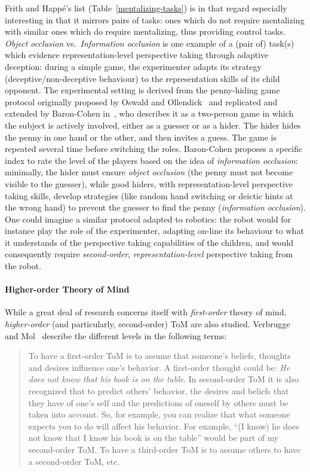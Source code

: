 \documentclass{sig-alternate}
\begin{document}
Frith and Happé's list (Table~\ref{mentalizing-tasks}) is in that regard
especially interesting in that it mirrors pairs of tasks: ones which do not
require mentalizing with similar ones which do require mentalizing, thus
providing control tasks.  \emph{Object occlusion} vs.~\emph{Information
occlusion} is one example of a (pair of) task(s) which evidence
representation-level perspective taking through adaptive deception: during a
simple game, the experimenter adapts its strategy (deceptive/non-deceptive
behaviour) to the representation skills of its child opponent. The experimental
setting is derived from the penny-hiding game protocol originally proposed by
Oswald and Ollendick~\cite{oswald1989role} and replicated and extended by
Baron-Cohen in~\cite{baron1992out}, who describes it as a two-person game in
which the subject is actively involved, either as a guesser or as a hider. The
hider hides the penny in one hand or the other, and then invites a guess. The
game is repeated several time before switching the roles. Baron-Cohen proposes a
specific index to rate the level of the players based on the idea of
\emph{information occlusion}: minimally, the hider must ensure \emph{object
occlusion} (the penny must not become visible to the guesser), while good
hiders, with representation-level perspective taking skills, develop strategies
(like random hand switching or deictic hints at the wrong hand) to prevent the
guesser to find the penny (\emph{information occlusion}). One could imagine a
similar protocol adapted to robotics: the robot would for instance play the role
of the experimenter, adapting on-line its behaviour to what it understands of
the perspective taking capabilities of the children, and would consequently
require \emph{second-order}, \emph{representation-level} perspective taking from
the robot.



\paragraph{Higher-order Theory of Mind}

While a great deal of research concerns itself with \emph{first-order} theory of
mind, \emph{higher-order} (and particularly, second-order) ToM are also studied.
Verbrugge and Mol~\cite{verbrugge2008learning} describe the different levels in
the following terms:
\begin{quote}
To have a first-order ToM is to assume that someone's beliefs, thoughts and
desires influence one's behavior. A first-order thought could be: \emph{He does not
know that his book is on the table}. In second-order ToM it is also recognized
that to predict others' behavior, the desires and beliefs that they have of
one's self and the predictions of oneself by others must be taken into account.
So, for example, you can realize that what someone expects you to do will affect
his behavior. For example, ``(I know) he does not know that I know his book is on
the table'' would be part of my second-order ToM. To have a third-order ToM is to
assume others to have a second-order ToM, etc.
\end{quote}
\end{document}
